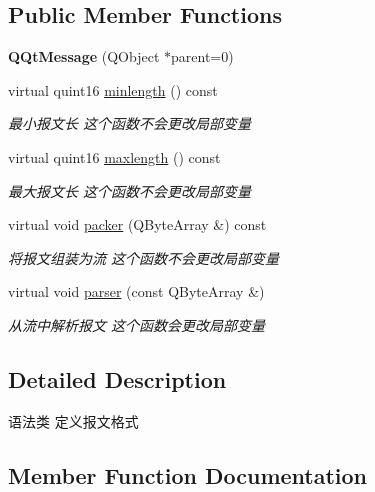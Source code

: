 \subsection*{Public Member Functions}
\begin{DoxyCompactItemize}
\item 
\mbox{\label{class_q_qt_message_a73676d445ae6c57038c5f15d3f827cae}} 
{\bfseries Q\+Qt\+Message} (Q\+Object $\ast$parent=0)
\item 
virtual quint16 \mbox{\hyperlink{class_q_qt_message_aa787045396462da8a56651e40dec7896}{minlength}} () const
\begin{DoxyCompactList}\small\item\em 最小报文长 这个函数不会更改局部变量 \end{DoxyCompactList}\item 
virtual quint16 \mbox{\hyperlink{class_q_qt_message_a141c945cf249d2cc7be8938078908e1f}{maxlength}} () const
\begin{DoxyCompactList}\small\item\em 最大报文长 这个函数不会更改局部变量 \end{DoxyCompactList}\item 
virtual void \mbox{\hyperlink{class_q_qt_message_af1885c2c3628495808dca66ee8d72e14}{packer}} (Q\+Byte\+Array \&) const
\begin{DoxyCompactList}\small\item\em 将报文组装为流 这个函数不会更改局部变量 \end{DoxyCompactList}\item 
virtual void \mbox{\hyperlink{class_q_qt_message_a0bc25669bdd61490b1d8df6d77565f31}{parser}} (const Q\+Byte\+Array \&)
\begin{DoxyCompactList}\small\item\em 从流中解析报文 这个函数会更改局部变量 \end{DoxyCompactList}\end{DoxyCompactItemize}


\subsection{Detailed Description}
语法类 定义报文格式 

\subsection{Member Function Documentation}
\mbox{\label{class_q_qt_message_a141c945cf249d2cc7be8938078908e1f}} 
